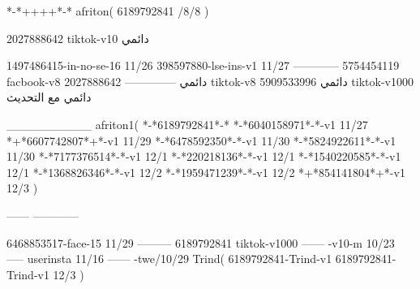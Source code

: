 *-*++++*-*
afriton(
6189792841 /8/8
)

2027888642 tiktok-v10
دائمي

1497486415-in-no-se-16 11/26
398597880-lse-ins-v1 11/27
------------
5754454119 facbook-v8
دائمي
--------------
2027888642 tiktok-v8
دائمي
5909533996 tiktok-v1000
دائمي مع التحديث

__________
afriton1(
*-*6189792841*-*
*-*6040158971*-*-v1 11/27
*+*6607742807*+*-v1 11/29
*-*6478592350*-*-v1 11/30
*-*5824922611*-*-v1 11/30
*-*7177376514*-*-v1 12/1
*-*220218136*-*-v1 12/1
*-*1540220585*-*-v1 12/1
*-*1368826346*-*-v1 12/2
*-*1959471239*-*-v1 12/2
*+*854141804*+*-v1 12/3
)

------
------------

6468853517-face-15 11/29
---------
6189792841 tiktok-v1000
------
-v10-m 10/23
-----
userinsta 11/16
------
-twe/10/29
Trind(
6189792841-Trind-v1 
6189792841-Trind-v1 12/3
)
